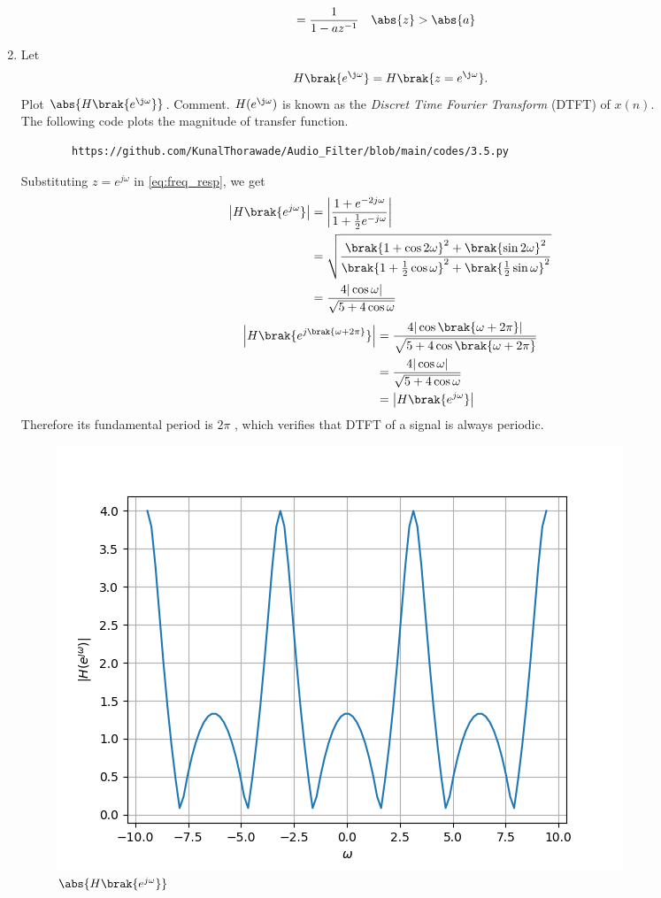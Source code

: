 \documentclass[journal,12pt,twocolumn]{IEEEtran}
\theoremstyle{remark}
\begin{document}
\begin{enumerate}[label=\thesection.\arabic*]
\begin{align}
							&= \frac{1}{1-az^{-1}} \quad \abs{z} > \abs{a}
		\end{align}
	\item 
		Let
		\begin{equation}
			H\brak{e^{\j \omega}} = H\brak{z = e^{\j \omega}}.
		\end{equation}
		Plot $\abs{H\brak{e^{\j \omega}}}$.  Comment.  $H(e^{\j \omega})$ is
		known as the {\em Discret Time Fourier Transform} (DTFT) of $x(n)$.
		\\
		\solution The following code plots the magnitude of transfer function.
		\begin{lstlisting}
		https://github.com/KunalThorawade/Audio_Filter/blob/main/codes/3.5.py
		\end{lstlisting}
		Substituting $z = e^{j \omega}$ in \eqref{eq:freq_resp}, we get
		\begin{align}
				\left|H\brak{e^{j\omega}}\right| &= \left|\frac{1 + e^{-2j\omega}}{1 + \frac{1}{2}e^{-j\omega}}\right| \\
													  &= \sqrt{\frac{\brak{1 + \cos{2\omega}}^2 + \brak{\sin{2\omega}}^2}{\brak{1 + \frac{1}{2}\cos{\omega}}^2 + \brak{\frac{1}{2}\sin{\omega}}^2}}\\
													  									  &= \frac{4|\cos{\omega}|}{\sqrt{5 + 4\cos{\omega}}}
		\end{align}
		\begin{align}
				\left|H\brak{e^{j\brak{\omega + 2\pi}}}\right| &= \frac{4|\cos\brak{\omega + 2\pi}|}{\sqrt{5 + 4\cos\brak{\omega + 2\pi}}} \\
															   &= \frac{4|\cos{\omega}|}{\sqrt{5 + 4\cos{\omega}}} \\
															   											   &= \left|H\brak{e^{j\omega}}\right|	
		\end{align}
		Therefore its fundamental period is $2\pi$ , which verifies that DTFT of a signal is always periodic.

		\begin{figure}[H]
			\centering
			\includegraphics[width=\columnwidth]{figs/H(z)_3.5.png}
			\caption{$\abs{H\brak{e^{j\omega}}}$}
			\label{fig:H(z)_3.5}
		\end{figure}
\end{enumerate}
\end{document}
